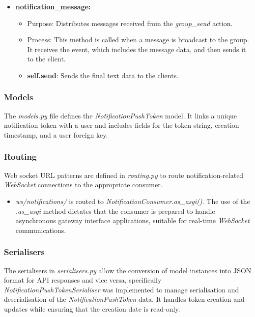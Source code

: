 \begin{itemize}
    \item \textbf{notification\_message:}
    \begin{itemize}
        \item Purpose: Distributes messages received from the \textit{group\_send} action.
        \item Process: This method is called when a message is broadcast to the group. It receives the event, which includes the message data, and then sends it to the client.
        \item \textbf{self.send}: Sends the final text data to the clients.
    \end{itemize}
\end{itemize}

\subsubsection{Models}

The \textit{models.py} file defines the \textit{NotificationPushToken} model. It links a unique notification token with a user and includes fields for the token string, creation timestamp, and a user foreign key.

\subsubsection{Routing}

Web socket URL patterns are defined in \textit{routing.py} to route notification-related \textit{WebSocket} connections to the appropriate consumer.

\begin{itemize}
    \item \textit{ws/notifications/} is routed to \textit{NotificationConsumer.as\_asgi()}. The use of the \textit{.as\_asgi} method dictates that the consumer is prepared to handle asynchronous gateway interface applications, suitable for real-time \textit{WebSocket} communications.
\end{itemize}

\subsubsection{Serialisers}

The serialisers in \textit{serialisers.py} allow the conversion of model instances into JSON format for API responses and vice versa, specifically \textit{NotificationPushTokenSerialiser} was implemented to manage serialisation and deserialisation of the \textit{NotificationPushToken} data. It handles token creation and updates while ensuring that the creation date is read-only.

